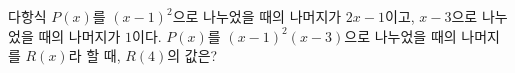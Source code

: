 다항식 $P(x)$를 $(x-1)^2$으로 나누었을 때의 나머지가 $2x-1$이고, $x-3$으로 나누었을 때의 나머지가 $1$이다. $P(x)$를 $(x-1)^2(x-3)$으로 나누었을 때의 나머지를 $R(x)$라 할 때, $R(4)$의 값은?
